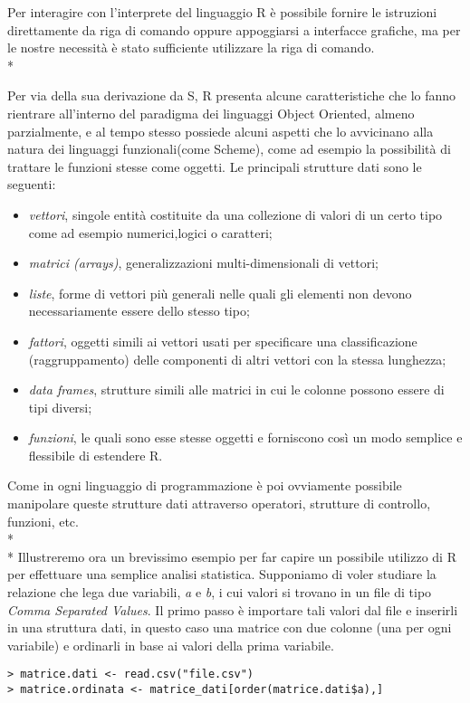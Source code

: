 \documentclass[12pt,a4paper,openright,twoside]{report}
\begin{document}
Per interagire con l'interprete del linguaggio R è possibile fornire le istruzioni direttamente da riga di comando oppure appoggiarsi a interfacce grafiche, ma per le nostre necessità è stato sufficiente utilizzare la riga di comando. \\*
 
Per via della sua derivazione da S, R presenta alcune caratteristiche che lo fanno rientrare all'interno del paradigma dei linguaggi Object Oriented, almeno parzialmente, e al tempo stesso possiede alcuni aspetti che lo avvicinano alla natura dei linguaggi funzionali(come Scheme), come ad esempio la possibilità di trattare le funzioni stesse come oggetti.
Le principali strutture dati sono le seguenti: \begin{itemize}
\item \emph{vettori}, singole entità costituite da una collezione di valori di un certo tipo come ad esempio numerici,logici o caratteri;
\item \emph{matrici (arrays)}, generalizzazioni multi-dimensionali di vettori;
\item \emph{liste}, forme di vettori più generali nelle quali gli elementi non devono necessariamente essere dello stesso tipo;
\item \emph{fattori}, oggetti simili ai vettori usati per specificare una classificazione (raggruppamento) delle componenti di altri vettori con la stessa lunghezza;
\item \emph{data frames}, strutture simili alle matrici in cui le colonne possono essere di tipi diversi;
\item \emph{funzioni}, le quali sono esse stesse oggetti e forniscono così un modo semplice e flessibile di estendere R.
\end{itemize}
Come in ogni linguaggio di programmazione è poi ovviamente possibile manipolare queste strutture dati attraverso operatori, strutture di controllo, funzioni, etc.\\* \\*
Illustreremo ora un brevissimo esempio per far capire un possibile utilizzo di R per effettuare una semplice analisi statistica. Supponiamo di voler studiare la relazione che lega due variabili, \emph{a} e \emph{b}, i cui valori si trovano in un file di tipo \emph{Comma Separated Values}. Il primo passo è importare tali valori dal file e inserirli in una struttura dati, in questo caso una matrice con due colonne (una per ogni variabile) e ordinarli in base ai valori della prima variabile.

\lstset{language=R}
\begin{lstlisting}
> matrice.dati <- read.csv("file.csv")
> matrice.ordinata <- matrice_dati[order(matrice.dati$a),]
\end{lstlisting}
\end{document}
